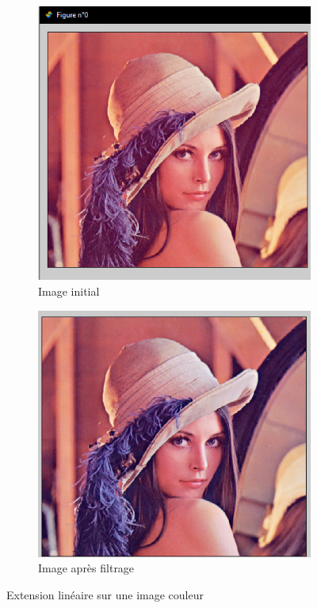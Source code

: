 \documentclass[12pt, letterpaper]{article}
\begin{document}
\begin{figure}[h!]
    \centering
    \begin{subfigure}[b]{0.7\linewidth}
      \includegraphics[width=\linewidth]{img/fig3.PNG}
      \caption{Image initial}
    \end{subfigure}
    \begin{subfigure}[b]{0.7\linewidth}
      \includegraphics[width=\linewidth]{img/fig13.PNG}
      \caption{Image après filtrage}
    \end{subfigure}
    \caption{Extension linéaire sur une image couleur}
    \label{fig:extend2}
\end{figure}
\end{document}
